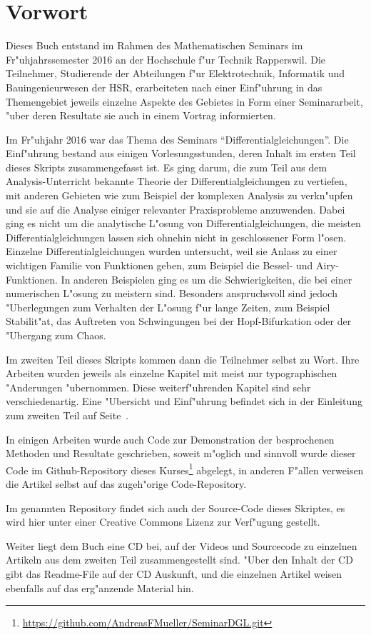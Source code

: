 %
%
%
\chapter*{Vorwort}
\rhead{}
Dieses Buch entstand im Rahmen des Mathematischen Seminars
im Fr"uhjahrssemester 2016 an der Hochschule f"ur Technik Rapperswil.
Die Teilnehmer, Studierende der Abteilungen f"ur Elektrotechnik,
Informatik und Bauingenieurwesen der
HSR, erarbeiteten nach einer Einf"uhrung in das Themengebiet jeweils
einzelne Aspekte des Gebietes in Form einer Seminararbeit, "uber
deren Resultate sie auch in einem Vortrag informierten. 

Im Fr"uhjahr 2016 war das Thema des Seminars ``Differentialgleichungen''.
Die Einf"uhrung bestand aus einigen Vorlesungsstunden, deren
Inhalt im ersten Teil dieses Skripts zusammengefasst ist.
Es ging darum, die zum Teil aus dem Analysis-Unterricht bekannte
Theorie der Differentialgleichungen zu vertiefen, mit anderen Gebieten
wie zum Beispiel der komplexen Analysis zu verkn"upfen und sie
auf die Analyse einiger relevanter Praxisprobleme anzuwenden.
Dabei ging es nicht um die analytische L"osung von Differentialgleichungen,
die meisten Differentialgleichungen lassen sich ohnehin nicht in
geschlossener Form l"osen.
Einzelne Differentialgleichungen wurden untersucht, weil sie Anlass
zu einer wichtigen Familie von Funktionen geben, zum Beispiel die
Bessel- und Airy-Funktionen.
In anderen Beispielen ging es um die Schwierigkeiten, die bei einer
numerischen L"osung zu meistern sind.
Besonders anspruchsvoll sind jedoch "Uberlegungen zum Verhalten der
L"osung f"ur lange Zeiten, zum Beispiel Stabilit"at, das Auftreten
von Schwingungen bei der Hopf-Bifurkation oder der "Ubergang zum
Chaos.

Im zweiten Teil dieses Skripts kommen dann die Teilnehmer selbst zu Wort.
Ihre Arbeiten wurden jeweils als einzelne
Kapitel mit meist nur typographischen "Anderungen "ubernommen.
Diese weiterf"uhrenden Kapitel sind sehr verschiedenartig.
Eine "Ubersicht und Einf"uhrung befindet sich in der Einleitung
zum zweiten Teil auf Seite~\pageref{skript:uebersicht}.

In einigen Arbeiten wurde auch Code zur Demonstration der 
besprochenen Methoden und Resultate geschrieben, soweit
m"oglich und sinnvoll wurde dieser Code im Github-Repository
dieses Kurses\footnote{\url{https://github.com/AndreasFMueller/SeminarDGL.git}}
abgelegt, in anderen F"allen verweisen die Artikel selbst auf
das zugeh"orige Code-Repository.

Im genannten Repository findet sich auch der Source-Code dieses
Skriptes, es wird hier unter einer Creative Commons Lizenz
zur Verf"ugung gestellt.

Weiter liegt dem Buch eine CD bei, auf der Videos und Sourcecode zu
einzelnen Artikeln aus dem zweiten Teil zusammengestellt sind.
"Uber den Inhalt der CD gibt das Readme-File auf der CD Auskunft,
und die einzelnen Artikel weisen ebenfalls auf das erg"anzende
Material hin.


